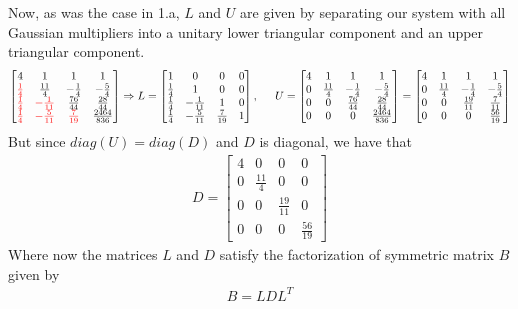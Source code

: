 \documentclass[11pt, letterpaper]{article}
\begin{document}
Now, as was the case in 1.a, $L$ and $U$ are given by separating our system with all Gaussian multipliers
into a unitary lower triangular component and an upper triangular component.
\begin{align*}
    \begin{bmatrix}
        4 & 1 & 1 & 1\\
        {\color{red}\frac{1}{4}} & \frac{11}{4} & -\frac{1}{4} & -\frac{5}{4}\\
        {\color{red}\frac{1}{4}}  & {\color{red}-\frac{1}{11}} & \frac{76}{44} & \frac{28}{44}\\
        {\color{red}\frac{1}{4}}  & {\color{red}-\frac{5}{11}} & {\color{red}\frac{7}{19}} & \frac{2464}{836}    
    \end{bmatrix}
    \Rightarrow L=
    \begin{bmatrix}
        1 & 0 & 0 & 0\\
        \frac{1}{4} & 1 & 0 & 0\\
        \frac{1}{4}  & -\frac{1}{11} & 1 & 0\\
        \frac{1}{4}  & -\frac{5}{11} & \frac{7}{19} & 1   
    \end{bmatrix}
    ,\indent U=
    \begin{bmatrix}
        4 & 1 & 1 & 1\\
        0 & \frac{11}{4} & -\frac{1}{4} & -\frac{5}{4}\\
        0 & 0 & \frac{76}{44} & \frac{28}{44}\\
        0  & 0 & 0 & \frac{2464}{836}    
    \end{bmatrix}
    =
    \begin{bmatrix}
        4 & 1 & 1 & 1\\
        0 & \frac{11}{4} & -\frac{1}{4} & -\frac{5}{4}\\
        0 & 0 & \frac{19}{11} & \frac{7}{11}\\
        0  & 0 & 0 & \frac{56}{19}    
    \end{bmatrix}
\end{align*}
But since $diag(U)=diag(D)$ and $D$ is diagonal, we have that
\begin{align*}
    D=
    \begin{bmatrix}
        4 & 0 & 0 & 0\\
        0 & \frac{11}{4} & 0 & 0\\
        0 & 0 & \frac{19}{11} & 0\\
        0 & 0 & 0 & \frac{56}{19}
    \end{bmatrix}
\end{align*}
Where now the matrices $L$ and $D$ satisfy the factorization of symmetric matrix $B$ given by
\begin{align*}
    B=LDL^T
\end{align*}
\end{document}
